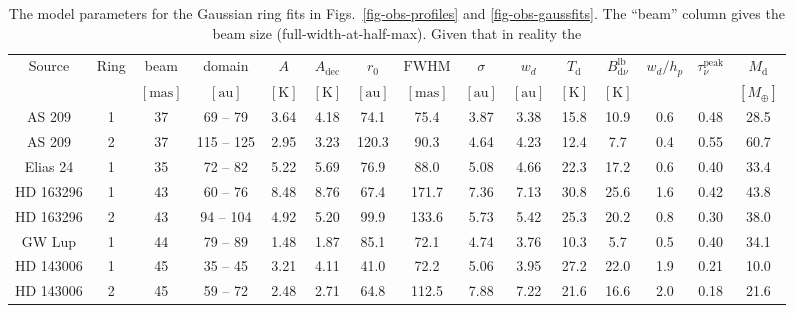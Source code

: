\documentclass{aa}
\begin{document}
\begin{table*}
\begin{center}
\begin{tabular}{|cc|cc|cccccc|ccccc|}
Source & Ring & beam & domain & $A$ & $A_{\mathrm{dec}}$ & $r_0$ & $\mathrm{FWHM}$ & $\sigma$ & $w_d$ & $T_{\mathrm{d}}$ & $B_{\mathrm{d}\nu}^{\mathrm{lb}}$ & $w_d/h_p$ & $\tau_\nu^{\mathrm{peak}}$ & $M_{\mathrm{d}}$\\
            & & $[\mathrm{mas}]$ & $[\mathrm{au}]$ & $[\mathrm{K}]$ & $[\mathrm{K}]$ & $[\mathrm{au}]$ & $[\mathrm{mas}]$ & $[\mathrm{au}]$ & $[\mathrm{au}]$ & $\mathrm{[K]}$ & $\mathrm{[K]}$ &  &  & $[M_{\oplus}]$\\
\hline
AS 209     & 1 & 37 &  69 --  79 &   3.64 &   4.18 &  74.1 &  75.4 &   3.87 &   3.38 &  15.8 &  10.9 &   0.6 &   0.48 &  28.5\\
AS 209     & 2 & 37 & 115 -- 125 &   2.95 &   3.23 & 120.3 &  90.3 &   4.64 &   4.23 &  12.4 &   7.7 &   0.4 &   0.55 &  60.7\\
Elias 24   & 1 & 35 &  72 --  82 &   5.22 &   5.69 &  76.9 &  88.0 &   5.08 &   4.66 &  22.3 &  17.2 &   0.6 &   0.40 &  33.4\\
HD 163296  & 1 & 43 &  60 --  76 &   8.48 &   8.76 &  67.4 & 171.7 &   7.36 &   7.13 &  30.8 &  25.6 &   1.6 &   0.42 &  43.8\\
HD 163296  & 2 & 43 &  94 -- 104 &   4.92 &   5.20 &  99.9 & 133.6 &   5.73 &   5.42 &  25.3 &  20.2 &   0.8 &   0.30 &  38.0\\
GW Lup     & 1 & 44 &  79 --  89 &   1.48 &   1.87 &  85.1 &  72.1 &   4.74 &   3.76 &  10.3 &   5.7 &   0.5 &   0.40 &  34.1\\
HD 143006  & 1 & 45 &  35 --  45 &   3.21 &   4.11 &  41.0 &  72.2 &   5.06 &   3.95 &  27.2 &  22.0 &   1.9 &   0.21 &  10.0\\
HD 143006  & 2 & 45 &  59 --  72 &   2.48 &   2.71 &  64.8 & 112.5 &   7.88 &   7.22 &  21.6 &  16.6 &   2.0 &   0.18 &  21.6\\
\hline
\hline
\end{tabular}
\end{center}
\caption{\label{tab-gauss-params}The model parameters for the Gaussian ring fits
  in Figs.~\ref{fig-obs-profiles} and \ref{fig-obs-gaussfits}. The ``beam''
  column gives the beam size (full-width-at-half-max). Given that in reality the
}
\end{table*}
\end{document}
